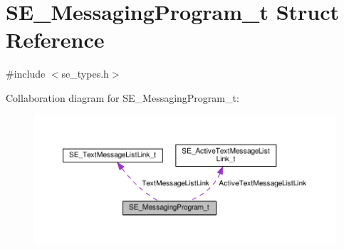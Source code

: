 \hypertarget{structSE__MessagingProgram__t}{}\section{S\+E\+\_\+\+Messaging\+Program\+\_\+t Struct Reference}
\label{structSE__MessagingProgram__t}


{\ttfamily \#include $<$se\+\_\+types.\+h$>$}



Collaboration diagram for S\+E\+\_\+\+Messaging\+Program\+\_\+t\+:\nopagebreak
\begin{figure}[H]
\begin{center}
\leavevmode
\includegraphics[width=350pt]{structSE__MessagingProgram__t__coll__graph}
\end{center}
\end{figure}

